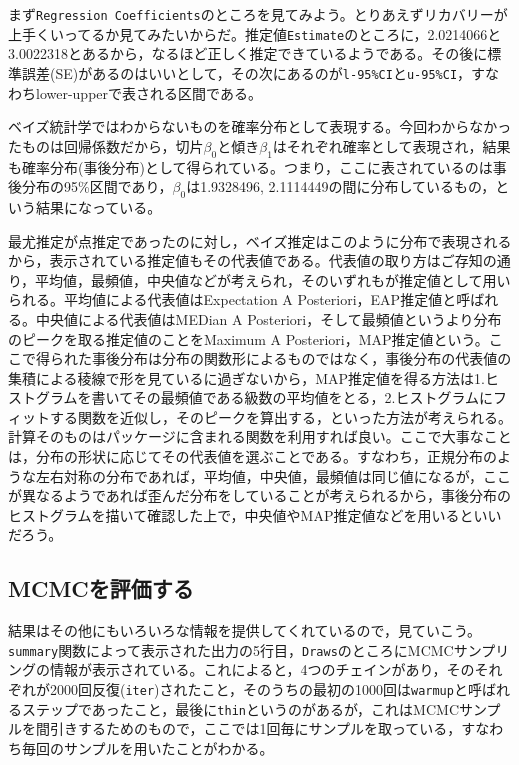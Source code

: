 \documentclass[
  a4paper,
]{ltjsbook}
\begin{document}
まず\texttt{Regression\ Coefficients}のところを見てみよう。とりあえずリカバリーが上手くいってるか見てみたいからだ。推定値\texttt{Estimate}のところに，2.0214066と3.0022318とあるから，なるほど正しく推定できているようである。その後に標準誤差(SE)があるのはいいとして，その次にあるのが\texttt{l-95\%CI}と\texttt{u-95\%CI}，すなわちlower-upperで表される区間である。

ベイズ統計学ではわからないものを確率分布として表現する。今回わからなかったものは回帰係数だから，切片\(\beta_0\)と傾き\(\beta_1\)はそれぞれ確率として表現され，結果も確率分布(事後分布)として得られている。つまり，ここに表されているのは事後分布の95\%区間であり，\(\beta_0\)は1.9328496,
2.1114449の間に分布しているもの，という結果になっている。

最尤推定が点推定であったのに対し，ベイズ推定はこのように分布で表現されるから，表示されている推定値もその代表値である。代表値の取り方はご存知の通り，平均値，最頻値，中央値などが考えられ，そのいずれもが推定値として用いられる。平均値による代表値はExpectation
A Posteriori，EAP推定値と呼ばれる。中央値による代表値はMEDian A
Posteriori，そして最頻値というより分布のピークを取る推定値のことをMaximum
A
Posteriori，MAP推定値という。ここで得られた事後分布は分布の関数形によるものではなく，事後分布の代表値の集積による稜線で形を見ているに過ぎないから，MAP推定値を得る方法は1.ヒストグラムを書いてその最頻値である級数の平均値をとる，2.ヒストグラムにフィットする関数を近似し，そのピークを算出する，といった方法が考えられる。計算そのものはパッケージに含まれる関数を利用すれば良い。ここで大事なことは，分布の形状に応じてその代表値を選ぶことである。すなわち，正規分布のような左右対称の分布であれば，平均値，中央値，最頻値は同じ値になるが，ここが異なるようであれば歪んだ分布をしていることが考えられるから，事後分布のヒストグラムを描いて確認した上で，中央値やMAP推定値などを用いるといいだろう。

\subsection{MCMCを評価する}\label{mcmcux3092ux8a55ux4fa1ux3059ux308b}

結果はその他にもいろいろな情報を提供してくれているので，見ていこう。\texttt{summary}関数によって表示された出力の5行目，\texttt{Draws}のところにMCMCサンプリングの情報が表示されている。これによると，4つのチェインがあり，そのそれぞれが2000回反復(\texttt{iter})されたこと，そのうちの最初の1000回は\texttt{warmup}と呼ばれるステップであったこと，最後に\texttt{thin}というのがあるが，これはMCMCサンプルを間引きするためのもので，ここでは1回毎にサンプルを取っている，すなわち毎回のサンプルを用いたことがわかる。
\end{document}
